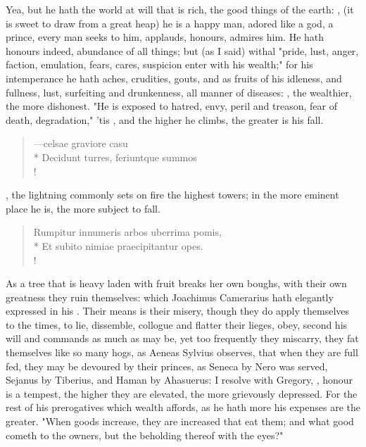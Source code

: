 {Yea, but he hath the world at will that is rich, the good things of the earth: , (it is sweet to draw from a great heap) he is a happy man, adored like a god, a prince, every man seeks to him, applauds, honours, admires him. He hath honours indeed, abundance of all things; but (as I said) withal "pride, lust, anger, faction, emulation, fears, cares, suspicion enter with his wealth;" for his intemperance he hath aches, crudities, gouts, and as fruits of his idleness, and fullness, lust, surfeiting and drunkenness, all manner of diseases: , the wealthier, the more dishonest. "He is exposed to hatred, envy, peril and treason, fear of death, degradation," \etc{} 'tis , and the higher he climbs, the greater is his fall.

\begin{latin}
\begin{verse}%
---celsae graviore casu\\*
Decidunt turres, feriuntque summos\\!
\end{verse}%
\end{latin}
%

, the lightning commonly sets on fire the highest towers; in the more eminent place he is, the more subject to fall.

\begin{latin}
\begin{verse}%
Rumpitur innumeris arbos uberrima pomis,\\*
Et subito nimiae praecipitantur opes.\\!
\end{verse}%
\end{latin}

As a tree that is heavy laden with fruit breaks her own boughs, with their own greatness they ruin themselves: which Joachimus Camerarius hath elegantly expressed in his  . Their means is their misery, though they do apply themselves to the times, to lie, dissemble, collogue and flatter their lieges, obey, second his will and commands as much as may be, yet too frequently they miscarry, they fat themselves like so many hogs, as Aeneas Sylvius observes, that when they are full fed, they may be devoured by their princes, as Seneca by Nero was served, Sejanus by Tiberius, and Haman by Ahasuerus: I resolve with Gregory, , honour is a tempest, the higher they are elevated, the more grievously depressed. For the rest of his prerogatives which wealth affords, as he hath more his expenses are the greater. "When goods increase, they are increased that eat them; and what good cometh to the owners, but the beholding thereof with the eyes?" 

}
